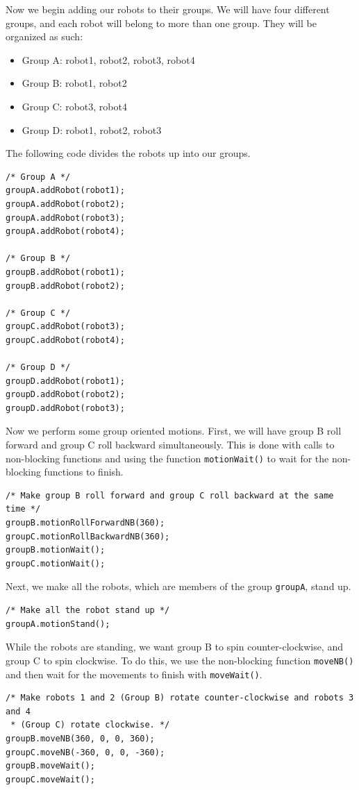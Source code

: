 \documentclass{article}
\begin{document}
Now we begin adding our robots to their groups. We will have four different groups, and each robot
will belong to more than one group. They will be organized as such:
\begin{itemize}
\item Group A: robot1, robot2, robot3, robot4
\item Group B: robot1, robot2
\item Group C: robot3, robot4
\item Group D: robot1, robot2, robot3
\end{itemize}
The following code divides the robots up into our groups.
\begin{verbatim}
/* Group A */
groupA.addRobot(robot1);
groupA.addRobot(robot2);
groupA.addRobot(robot3);
groupA.addRobot(robot4);

/* Group B */
groupB.addRobot(robot1);
groupB.addRobot(robot2);

/* Group C */
groupC.addRobot(robot3);
groupC.addRobot(robot4);

/* Group D */
groupD.addRobot(robot1);
groupD.addRobot(robot2);
groupD.addRobot(robot3);
\end{verbatim}

Now we perform some group oriented motions. First, we will have group B roll forward and group C
roll backward simultaneously. This is done with calls to non-blocking functions and using the
function \texttt{motionWait()} to wait for the non-blocking functions to finish.
\begin{verbatim}
/* Make group B roll forward and group C roll backward at the same time */
groupB.motionRollForwardNB(360);
groupC.motionRollBackwardNB(360);
groupB.motionWait();
groupC.motionWait();
\end{verbatim}

Next, we make all the robots, which are members of the group \texttt{groupA}, 
stand up.
\begin{verbatim}
/* Make all the robot stand up */
groupA.motionStand();
\end{verbatim}

While the robots are standing, we want group B to spin counter-clockwise, and group
C to spin clockwise. To do this, we use the non-blocking function \texttt{moveNB()}
and then wait for the movements to finish with \texttt{moveWait()}.
\begin{verbatim}
/* Make robots 1 and 2 (Group B) rotate counter-clockwise and robots 3 and 4
 * (Group C) rotate clockwise. */
groupB.moveNB(360, 0, 0, 360);
groupC.moveNB(-360, 0, 0, -360);
groupB.moveWait();
groupC.moveWait();
\end{verbatim}
\end{document}
